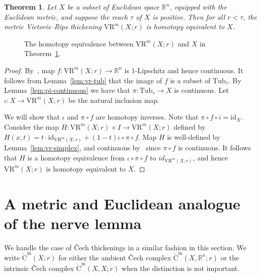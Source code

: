 \documentclass{amsart}
\theoremstyle{plain}
\newtheorem{theorem}[lemma]{Theorem}
\theoremstyle{definition}
\theoremstyle{myremark}
\newcommand{\R}{\mathbb{R}}
\newcommand{\vrm}[2]{\mathrm{VR}^m(#1;#2)}
\newcommand{\cechm}[2]{\mathrm{\check{C}^m}(#1;#2)}
\newcommand{\cecham}[3]{\mathrm{\check{C}^m}(#1,#2;#3)}
\newcommand{\id}{\mathrm{id}}
\newcommand{\Tub}{\mathrm{Tub}}
\newcommand{\comp}{\circ}
\begin{document}
\begin{theorem}\label{thm:main}
Let $X$ be a subset of Euclidean space $\R^n$, equipped with the Euclidean metric, and suppose the reach $\tau$ of $X$ is positive. Then for all $r < \tau$, the metric Vietoris--Rips thickening $\vrm{X}{r}$ is homotopy equivalent to $X$.
\end{theorem}

\begin{figure}[h]
\def\svgwidth{6in}

\caption{The homotopy equivalence between $\vrm{X}{r}$ and $X$ in Theorem~\ref{thm:main}.}
\end{figure}

\begin{proof}
By~\cite[Lemma~5.2]{MetricReconstructionViaOptimalTransport}, map $f\colon \vrm{X}{r}\to \R^n$ is $1$-Lipschitz and hence continuous.
It follows from Lemma~\ref{lem:vr-tub} that the image of $f$ is a subset of $\Tub_\tau$.
By Lemma~\ref{lem:pi-continuous} we have that $\pi \colon \Tub_{\tau} \to X$ is continuous.
Let $\iota \colon X \rightarrow \vrm{X}{r}$ be the natural inclusion map.

We will show that $\iota$ and $\pi \circ f$ are homotopy inverses.
Note that $\pi \comp f \comp i = \id_{X}$.
Consider the map $H\colon \vrm{X}{r} \times I \rightarrow \vrm{X}{r}$ defined by $H(x,t) = t\cdot\id_{\vrm{X}{r}} + (1 - t) \iota \comp \pi \comp f$.
Map $H$ is well-defined by Lemma~\ref{lem:vr-simplex}, and continuous by~\cite[Lemma~3.8]{MetricReconstructionViaOptimalTransport} since $\pi \comp f$ is continuous. 
It follows that $H$ is a homotopy equivalence from $\iota \circ \pi \circ f$ to $id_{\vrm{X}{r}}$, and hence $\vrm{X}{r}$ is homotopy equivalent to $X$.
\end{proof}

\section{A metric and Euclidean analogue of the nerve lemma}\label{sec:Euclidean-nerve}

We handle the case of \v{C}ech thickenings in a similar fashion in this section. We write $\cechm{X}{r}$ for either the ambient \v{C}ech complex $\cecham{X}{\R^n}{r}$ or the intrinsic \v{C}ech complex $\cecham{X}{X}{r}$ when the distinction is not important.
\end{document}
